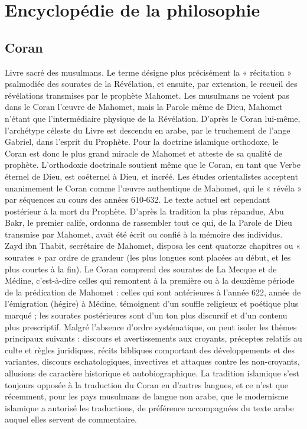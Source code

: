 
\section{Encyclopédie de la philosophie}

\subsection{Coran}
Livre sacré des musulmans. Le
terme désigne plus précisément la « récitation »
psalmodiée des sourates de la
Révélation, et ensuite, par extension, le
recueil des révélations transmises par le
prophète Mahomet. Les musulmans ne
voient pas dans le Coran l’œuvre de
Mahomet, mais la Parole même de Dieu,
Mahomet n'étant que l’intermédiaire physique
de la Révélation. D’après le Coran
lui-même, l’archétype céleste du Livre est
descendu en arabe, par le truchement de
l'ange Gabriel, dans l’esprit du Prophète.
Pour la doctrine islamique orthodoxe, le
Coran est donc le plus grand miracle de
Mahomet et atteste de sa qualité de prophète.
L’orthodoxie doctrinale soutient
même que le Coran, en tant que Verbe
éternel de Dieu, est coéternel à Dieu, et
incréé. Les études orientalistes acceptent
unanimement le Coran comme l’œuvre
authentique de Mahomet, qui le « révéla »
par séquences au cours des années
610-632. Le texte actuel est cependant
postérieur à la mort du Prophète. D’après
la tradition la plus répandue, Abu Bakr,
le premier calife, ordonna de rassembler
tout ce qui, de la Parole de Dieu transmise
par Mahomet, avait été écrit ou
confié à la mémoire des individus. Zayd
ibn Thabit, secrétaire de Mahomet, disposa
les cent quatorze chapitres ou « sourates »
par ordre de grandeur (les plus
longues sont placées au début, et les plus
courtes à la fin). Le Coran comprend des
sourates de La Mecque et de Médine,
c’est-à-dire celles qui remontent à la première
ou à la deuxième période de la prédication
de Mahomet : celles qui sont
antérieures à l’année 622, année de l’émigration
(hégire) à Médine, témoignent
d’un souffle religieux et poétique plus
marqué ; les sourates postérieures sont
d’un ton plus discursif et d’un contenu
plus prescriptif. Malgré l’absence d’ordre
systématique, on peut isoler les thèmes
principaux suivants : discours et avertissements
aux croyants, préceptes relatifs au
culte et règles juridiques, récits bibliques
comportant des développements et des
variantes, discours eschatologiques, invectives
et attaques contre les non-croyants,
allusions de caractère historique et autobiographique.
La tradition islamique s’est
toujours opposée à la traduction du
Coran en d’autres langues, et ce n’est que
récemment, pour les pays musulmans de
langue non arabe, que le modernisme islamique
a autorisé les traductions, de préférence
accompagnées du texte arabe
auquel elles servent de commentaire.


